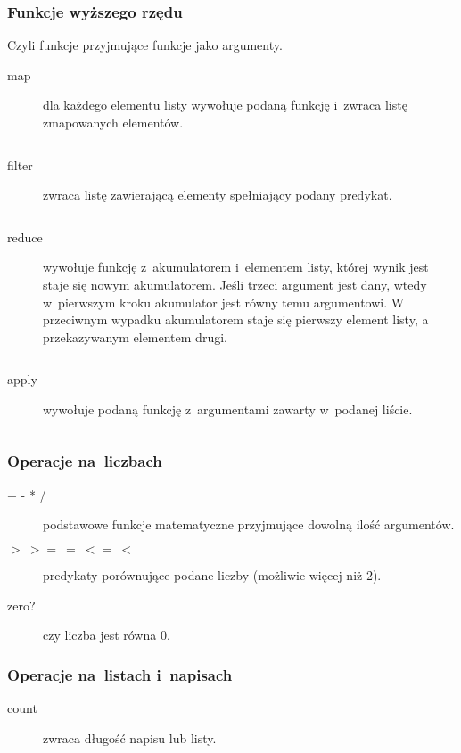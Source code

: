 \documentclass[a4paper,11pt]{article}
\newcommand{\clj}[1]{\inputminted[fontsize=\footnotesize]{clojure}{code/#1.clj}}
\begin{document}
\subsubsection{Funkcje wyższego rzędu}

Czyli funkcje przyjmujące funkcje jako argumenty.

\begin{description}
\item[map] dla każdego elementu listy wywołuje podaną funkcję i~zwraca listę
  zmapowanych elementów.
  \clj{map}

\item[filter] zwraca listę zawierającą elementy spełniający podany predykat.
  \clj{filter}

\item[reduce] wywołuje funkcję z~akumulatorem i~elementem listy, której wynik
  jest staje się nowym akumulatorem. Jeśli trzeci argument jest dany, wtedy
  w~pierwszym kroku akumulator jest równy temu argumentowi. W przeciwnym
  wypadku akumulatorem staje się pierwszy element listy, a przekazywanym
  elementem drugi.
  \clj{reduce}

\item[apply] wywołuje podaną funkcję z~argumentami zawarty w~podanej liście.
  \clj{apply}

\end{description}

\subsubsection{Operacje na~liczbach}

\begin{description}
\item[+ - * /] podstawowe funkcje matematyczne przyjmujące dowolną ilość
  argumentów.

\item[$> \ >= \ = \ <= \ <$] predykaty porównujące podane liczby (możliwie
  więcej niż 2).

\item[zero?] czy liczba jest równa 0.
\end{description}

\subsubsection{Operacje na~listach i~napisach}

\begin{description}
\item[count] zwraca długość napisu lub listy.
\end{description}
\end{document}
